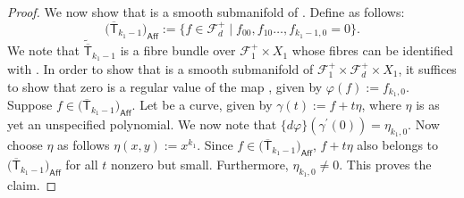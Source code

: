 \documentclass[11pt]{article}
\numberwithin{equation}{section}
\begin{document}
\begin{proof}
We now show that  is a smooth submanifold
of .
Define  as follows:
\[ \bigl(\overline{\mathsf{T}}_{k_1-1}\bigr)_{\mathsf{Aff}} :=
\bigl\{ f \in \mathcal{F}_d^{+}\mid f_{00}, f_{10} \dots, f_{k_1-1, 0} =0\bigr\}. \]
We note that
$\widetilde{\overline{\mathsf{T}}}_{k_1-1}$
is a fibre bundle over $\mathcal{F}_1^+\times X_1$
whose fibres can be identified with
.
In order to show that
 is a smooth submanifold of
$\mathcal{F}_1^+\times \mathcal{F}_d^+\times X_1$, it suffices to show that
zero is a regular value of the map
, given by
$\varphi(f):= f_{k_1, 0}$.
Suppose
$f \in \bigl(\overline{\mathsf{T}}_{k_1-1}\bigr)_{\mathsf{Aff}}$.
Let 
be a curve, given by
$\gamma(t):= f+t\eta$,
where $\eta$ is as yet an unspecified polynomial. We now note that
$\{d \varphi\}(\gamma^{\prime}(0)) = \eta_{k_1, 0}$. Now choose $\eta$ as follows
$\eta(x, y) := x^{k_1}$.
Since
$f \in \bigl(\overline{\mathsf{T}}_{k_1-1}\bigr)_{\mathsf{Aff}}$,
$f + t \eta$ also belongs to $\bigl(\overline{\mathsf{T}}_{k_1-1}\bigr)_{\mathsf{Aff}}$
for all $t$ nonzero but small.
Furthermore, $\eta_{k_1, 0} \neq 0$. This proves the claim.


\end{proof}
\end{document}
